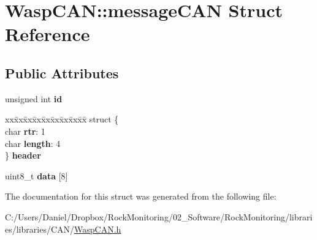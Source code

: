 \hypertarget{struct_wasp_c_a_n_1_1message_c_a_n}{}\section{Wasp\+C\+AN\+:\+:message\+C\+AN Struct Reference}
\label{struct_wasp_c_a_n_1_1message_c_a_n}
\subsection*{Public Attributes}
\begin{DoxyCompactItemize}
\item 
unsigned int {\bfseries id}\hypertarget{struct_wasp_c_a_n_1_1message_c_a_n_a86dfdb37ce6b51c1513e5e36b1748f82}{}\label{struct_wasp_c_a_n_1_1message_c_a_n_a86dfdb37ce6b51c1513e5e36b1748f82}

\item 
\begin{tabbing}
xx\=xx\=xx\=xx\=xx\=xx\=xx\=xx\=xx\=\kill
struct \{\\
\>char {\bfseries rtr}: 1\\
\>char {\bfseries length}: 4\\
\} {\bfseries header}\hypertarget{struct_wasp_c_a_n_1_1message_c_a_n_acc9063a23eb1dc6c651de248e92defe0}{}\label{struct_wasp_c_a_n_1_1message_c_a_n_acc9063a23eb1dc6c651de248e92defe0}
\\

\end{tabbing}\item 
uint8\+\_\+t {\bfseries data} \mbox{[}8\mbox{]}\hypertarget{struct_wasp_c_a_n_1_1message_c_a_n_a8831fd11f400fe6ba263ba779ba276c2}{}\label{struct_wasp_c_a_n_1_1message_c_a_n_a8831fd11f400fe6ba263ba779ba276c2}

\end{DoxyCompactItemize}


The documentation for this struct was generated from the following file\+:\begin{DoxyCompactItemize}
\item 
C\+:/\+Users/\+Daniel/\+Dropbox/\+Rock\+Monitoring/02\+\_\+\+Software/\+Rock\+Monitoring/libraries/libraries/\+C\+A\+N/\hyperlink{_wasp_c_a_n_8h}{Wasp\+C\+A\+N.\+h}\end{DoxyCompactItemize}

